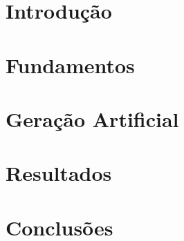 \documentclass[mestrado, pre-defesa, english, brazil]{packages/icmc}
\begin{document}
\textual

\chapter{Introdução}
\label{chapter:introducao}


\chapter{Fundamentos}
\label{chapter:fundamentos}


\chapter{Geração Artificial}
\label{chapter:metodo}


\chapter{Resultados}
\label{chapter:resultados}


\chapter{Conclusões}
\label{chapter:conclusões}


%

\postextual





\glsaddall
\printglossaries

\end{document}
